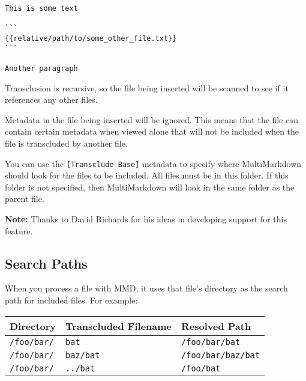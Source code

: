 \begin{verbatim}
This is some text

```
{{relative/path/to/some_other_file.txt}}
```

Another paragraph
\end{verbatim}

Transclusion is recursive, so the file being inserted will be scanned to see if it references any other files.

Metadata in the file being inserted will be ignored. This means that the file can contain certain metadata when viewed alone that will not be included when the file is transcluded by another file.

You can use the \texttt{[Transclude Base]} metadata to specify where MultiMarkdown should look for the files to be included. All files must be in this folder. If this folder is not specified, then MultiMarkdown will look in the same folder as the parent file.

\textbf{Note:} Thanks to David Richards for his ideas in developing support for this feature.

\subsection{Search Paths}
\label{searchpaths}

When you process a file with \gls{MMD}, it uses that file's directory as the search
path for included files. For example:

\begin{table}[htbp]
\begin{minipage}{\linewidth}
\setlength{\tymax}{0.5\linewidth}
\centering
\small
\begin{tabulary}{\textwidth}{@{}lll@{}} \toprule
 Directory	& Transcluded Filename	& Resolved Path 	\\
\midrule

 \texttt{\slash foo\slash bar\slash }	& \texttt{bat}	& \texttt{\slash foo\slash bar\slash bat}	\\
 \texttt{\slash foo\slash bar\slash }	& \texttt{baz\slash bat}	& \texttt{\slash foo\slash bar\slash baz\slash bat}	\\
 \texttt{\slash foo\slash bar\slash }	& \texttt{..\slash bat} 	& \texttt{\slash foo\slash bat}	\\
\bottomrule

\end{tabulary}
\end{minipage}
\end{table}

